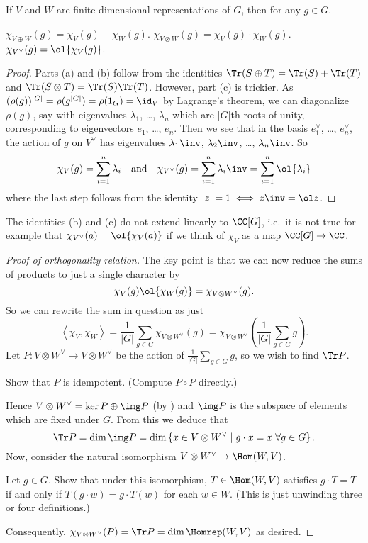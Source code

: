 \begin{theorem}
	If $V$ and $W$ are finite-dimensional representations of $G$,
	then for any $g \in G$.
	\begin{enumerate}[(a)]
		\ii $\chi_{V \oplus W}(g) = \chi_V(g) + \chi_W(g)$.
		\ii $\chi_{V \otimes W}(g) = \chi_V(g) \cdot \chi_W(g)$.
		\ii $\chi_{V^\vee}(g) = \ol{\chi_V(g)}$.
	\end{enumerate}
\end{theorem}
\begin{proof}
	Parts (a) and (b) follow from the identities
	$\Tr(S \oplus T) = \Tr(S) + \Tr(T)$
	and $\Tr(S \otimes T) = \Tr(S) \Tr(T)$.
	However, part (c) is trickier.
	As $(\rho(g))^{|G|} = \rho(g^{|G|}) = \rho(1_G) = \id_V$
	by Lagrange's theorem, we can diagonalize $\rho(g)$,
	say with eigenvalues $\lambda_1$, \dots, $\lambda_n$
	which are $|G|$th roots of unity,
	corresponding to eigenvectors $e_1$, \dots, $e_n$.
	Then we see that in the basis $e_1^\vee$, \dots, $e_n^\vee$,
	the action of $g$ on $V^\vee$ has eigenvalues
	$\lambda_1\inv$, $\lambda_2\inv$, \dots, $\lambda_n\inv$.
	So
	\[
		\chi_V(g) = \sum_{i=1}^n \lambda_i \quad\text{and}\quad
		\chi_{V^\vee}(g) = \sum_{i=1}^n \lambda_i\inv = \sum_{i=1}^n \ol{\lambda_i}
	\]
	where the last step follows from the identity $|z|=1 \iff z\inv = \ol z$.
\end{proof}
\begin{remark}
	[Warning]
	The identities (b) and (c) do not extend linearly to $\CC[G]$,
    i.e.\ it is not true for example that $\chi_{V^\vee}(a) = \ol{\chi_V(a)}$
	if we think of $\chi_V$ as a map $\CC[G] \to \CC$.
\end{remark}
\begin{proof}
	[Proof of orthogonality relation]
	The key point is that we can now reduce
	the sums of products to just a single character by
	\[ \chi_V(g) \ol{\chi_W(g)} = \chi_{V \otimes W^\vee} (g). \]
	So we can rewrite the sum in question as just
	\[
		\left< \chi_V, \chi_W \right>
		= \frac{1}{|G|} \sum_{g \in G} \chi_{V \otimes W^\vee} (g)
		= \chi_{V \otimes W^\vee}
		\left( \frac{1}{|G|} \sum_{g \in G} g \right).
	\]
	Let $P \colon V \otimes W^\vee \to V \otimes W^\vee$ be the
	action of $\frac{1}{|G|} \sum_{g \in G} g$,
	so we wish to find $\Tr P$.
	\begin{exercise}
		Show that $P$ is idempotent.
		(Compute $P \circ P$ directly.)
	\end{exercise}
	Hence $V \otimes W^\vee = \ker P \oplus \img P$ (by )
	and $\img P$ is the subspace of elements which are fixed under $G$.
	From this we deduce that
	\[ \Tr P = \dim \img P =
		\dim \left\{ x \in V \otimes W^\vee
		\mid g \cdot x = x \; \forall g \in G  \right\}.
		\]
	Now, consider the natural isomorphism $V \otimes W^\vee \to \Hom(W, V)$.
	\begin{exercise}
		Let $g \in G$.
		Show that under this isomorphism, $T \in \Hom(W, V)$
		satisfies $g \cdot T = T$ if and only if
		$T(g \cdot w) = g \cdot T(w)$ for each $w \in W$.
		(This is just unwinding three or four definitions.)
	\end{exercise}
	Consequently, $\chi_{V \otimes W^\vee}(P) = \Tr P = \dim \Homrep(W,V)$
	as desired.
\end{proof}

